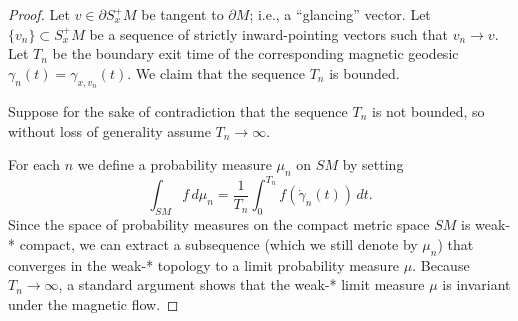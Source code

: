 \documentclass[12pt]{amsart}
\numberwithin{equation}{section}
\begin{document}

\begin{proof}
Let $v \in \partial S_x^+ M$ be tangent to $\partial M$; i.e., a ``glancing'' vector. Let $\{v_n\} \subset S_x^+ M$ be a sequence of strictly inward-pointing vectors such that $v_n \to v$. Let $T_n$ be the boundary exit time of the corresponding magnetic geodesic $\gamma_n(t) = \gamma_{x, v_n}(t)$. We claim that the sequence $T_{n}$ is bounded.

Suppose for the sake of contradiction that the sequence $T_{n}$ is not bounded, so without loss of generality assume $T_{n}\to\infty$.

For each $n$ we define a probability measure $\mu_n$ on $SM$ by setting
\begin{equation}
    \int_{SM} f \, d\mu_n = \frac{1}{T_n} \int_0^{T_n} f(\dot{\gamma}_n(t)) \, dt.
\end{equation}
Since the space of probability measures on the compact metric space $SM$ is weak-* compact, we can extract a subsequence (which we still denote by $\mu_n$) that converges in the weak-* topology to a limit probability measure $\mu$. Because $T_n \to \infty$, a standard argument shows that the weak-* limit measure $\mu$ is invariant under the magnetic flow.


\end{proof}
\end{document}
